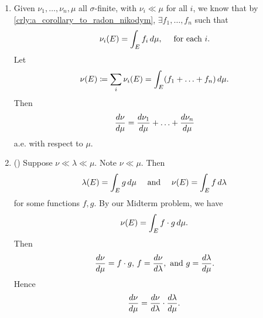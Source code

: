 \documentclass[notoc,notitlepage]{tufte-book}
\begin{document}
\begin{note}
  \begin{enumerate}
    \item Given $\nu_1, \ldots, \nu_n, \mu$ all $\sigma$-finite,
      with $\nu_i \ll \mu$ for all $i$,
      we know that by \cref{crly:a_corollary_to_radon_nikodym},
      $\exists f_1, \ldots, f_n$ such that
      \begin{equation*}
        \nu_i(E) = \int_{E} f_i \mathop{}\!d{\mu},\quad \text{ for each } i.
      \end{equation*}
      Let
      \begin{equation*}
        \nu(E) \coloneqq \sum_{i} \nu_i(E)
              = \int_{E} (f_1 + \hdots + f_n) \mathop{}\!d{\mu}.
      \end{equation*}
      Then
      \begin{equation*}
        \frac{\mathop{}\!d{\nu}}{\mathop{}\!d{\mu}}
        = \frac{\mathop{}\!d{\nu_1}}{\mathop{}\!d{\mu}} + \hdots + \frac{\mathop{}\!d{\nu_n}}{\mathop{}\!d{\mu}}
      \end{equation*}
      a.e. with respect to $\mu$.

    \item ()
      Suppose $\nu \ll \lambda \ll \mu$. Note $\nu \ll \mu$.
      Then
      \begin{equation*}
        \lambda(E) = \int_{E} g \mathop{}\!d{\mu} \quad\text{ and }\quad
        \nu(E) = \int_{E} f \mathop{}\!d{\lambda}
      \end{equation*}
      for some functions $f, g$.
      By our Midterm problem, we have
      \begin{equation*}
        \nu(E) = \int_{E} f \cdot g \mathop{}\!d{\mu}.
      \end{equation*}
      Then
      \begin{equation*}
        \frac{\mathop{}\!d{\nu}}{\mathop{}\!d{\mu}} = f \cdot g,\,
        f = \frac{\mathop{}\!d{\nu}}{\mathop{}\!d{\lambda}}, \text{ and }
        g = \frac{\mathop{}\!d{\lambda}}{\mathop{}\!d{\mu}}.
      \end{equation*}
      Hence
      \begin{equation*}
        \frac{\mathop{}\!d{\nu}}{\mathop{}\!d{\mu}}
        = \frac{\mathop{}\!d{\nu}}{\mathop{}\!d{\lambda}} \cdot \frac{\mathop{}\!d{\lambda}}{\mathop{}\!d{\mu}}.
      \end{equation*}


\end{enumerate}
\end{note}
\end{document}
